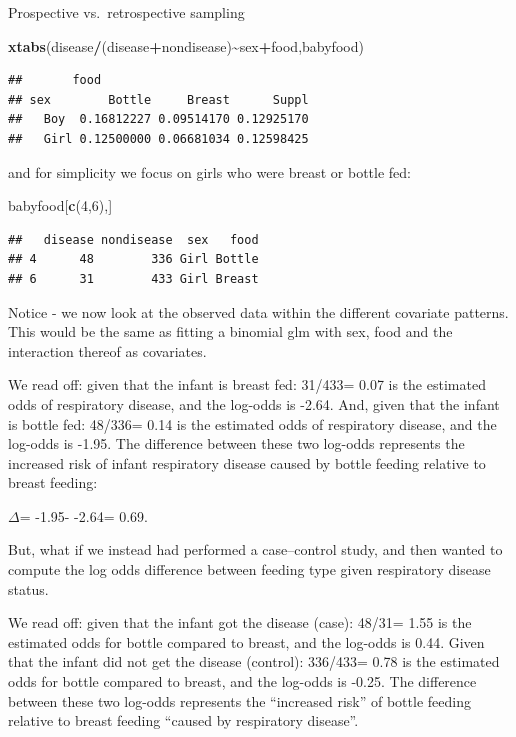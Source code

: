 \documentclass[
  ignorenonframetext,
]{beamer}
\newenvironment{Shaded}{\begin{snugshade}}{\end{snugshade}}
\newcommand{\DecValTok}[1]{\textcolor[rgb]{0.00,0.00,0.81}{#1}}
\newcommand{\FunctionTok}[1]{\textcolor[rgb]{0.13,0.29,0.53}{\textbf{#1}}}
\newcommand{\NormalTok}[1]{#1}
\newcommand{\SpecialCharTok}[1]{\textcolor[rgb]{0.81,0.36,0.00}{\textbf{#1}}}
\begin{document}
\begin{frame}[fragile]{Prospective vs.~retrospective sampling}
\begin{Shaded}
\begin{Highlighting}[]
\FunctionTok{xtabs}\NormalTok{(disease}\SpecialCharTok{/}\NormalTok{(disease}\SpecialCharTok{+}\NormalTok{nondisease)}\SpecialCharTok{\textasciitilde{}}\NormalTok{sex}\SpecialCharTok{+}\NormalTok{food,babyfood)}
\end{Highlighting}
\end{Shaded}

\begin{verbatim}
##       food
## sex        Bottle     Breast      Suppl
##   Boy  0.16812227 0.09514170 0.12925170
##   Girl 0.12500000 0.06681034 0.12598425
\end{verbatim}

and for simplicity we focus on girls who were breast or bottle fed:

\begin{Shaded}
\begin{Highlighting}[]
\NormalTok{babyfood[}\FunctionTok{c}\NormalTok{(}\DecValTok{4}\NormalTok{,}\DecValTok{6}\NormalTok{),]}
\end{Highlighting}
\end{Shaded}

\begin{verbatim}
##   disease nondisease  sex   food
## 4      48        336 Girl Bottle
## 6      31        433 Girl Breast
\end{verbatim}

Notice - we now look at the observed data within the different covariate
patterns. This would be the same as fitting a binomial glm with sex,
food and the interaction thereof as covariates.

We read off: given that the infant is breast fed: 31/433= 0.07 is the
estimated odds of respiratory disease, and the log-odds is -2.64. And,
given that the infant is bottle fed: 48/336= 0.14 is the estimated odds
of respiratory disease, and the log-odds is -1.95. The difference
between these two log-odds represents the increased risk of infant
respiratory disease caused by bottle feeding relative to breast feeding:

\(\Delta\)= -1.95- -2.64= 0.69.

But, what if we instead had performed a case--control study, and then
wanted to compute the log odds difference between feeding type given
respiratory disease status.

We read off: given that the infant got the disease (case): 48/31= 1.55
is the estimated odds for bottle compared to breast, and the log-odds is
0.44. Given that the infant did not get the disease (control): 336/433=
0.78 is the estimated odds for bottle compared to breast, and the
log-odds is -0.25. The difference between these two log-odds represents
the ``increased risk'' of bottle feeding relative to breast feeding
``caused by respiratory disease''.


\end{frame}
\end{document}
